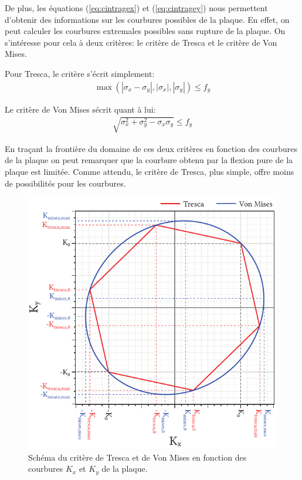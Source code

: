\documentclass[11pt,titlepage]{article}
\begin{document}
De plus, les équations (\ref{eq:cintragex}) et (\ref{eq:cintragey}) nous permettent d'obtenir des informations sur les courbures possibles de la plaque. En effet, on peut calculer les courbures extremales possibles sans rupture de la plaque. On s'intéresse pour cela à deux critères: le critère de Tresca et le critère de Von Mises.

Pour Tresca, le critère s'écrit simplement:
\begin{align}
\max\left ( \left | \sigma_x - \sigma_y\right |,\left | \sigma_x\right |,\left | \sigma_y\right |\right ) \leq f_y
\end{align}

Le critère de Von Mises sécrit quant à lui:
\begin{align}
\sqrt{\sigma_x^2+\sigma_y^2-\sigma_x\sigma_y} \leq f_y
\end{align}

En traçant la frontière du domaine de ces deux critères en fonction des courbures de la plaque on peut remarquer que la courbure obtenu par la flexion pure de la plaque est limitée. Comme attendu, le critère de Tresca, plus simple, offre moins de possibilités pour les courbures. 

\begin{figure}
    \vspace{-10pt}
    \includegraphics[width=\linewidth]{img/cintrage_froid/critere_petitedef.pdf}
       \caption{Schéma du critère de Tresca et de Von Mises en fonction des courbures $K_x$ et $K_y$ de la plaque.}
   \label{fig:tresca_mises}
   \end{figure}
\end{document}
